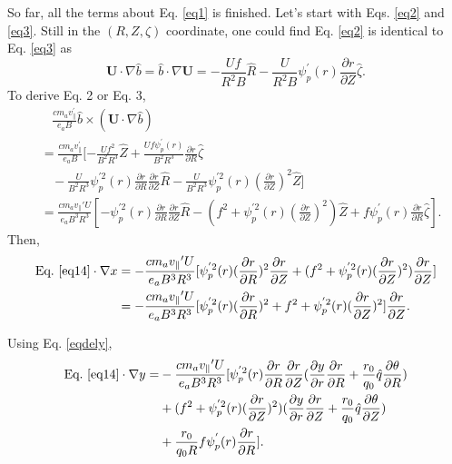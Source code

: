 \documentclass[12pt]{article}
\begin{document}
\begin{CJK*}{UTF8}{gbsn}
So far, all the terms about Eq. \ref{eq1} is finished. Let's start with Eqs. \ref{eq2} and \ref{eq3}.
Still in the $(R,Z,\zeta)$ coordinate, one could find Eq. \ref{eq2} is identical to Eq. \ref{eq3} as
\begin{equation}
    \mathbf{U}\cdot\nabla\hat{b} = \hat{b}\cdot\nabla\mathbf{U} = - \frac{Uf}{R^2B}\hat{R} - \frac{U}{R^2B}\psi_p^{'}(r)\frac{\partial r}{\partial Z}\hat{\zeta}.
\end{equation}
To derive Eq. 2 or Eq. 3, 
\begin{equation}
\begin{split}
    &\ \ \ \  \frac{cm_av_{\parallel}^{'}}{e_aB} \hat{b} \times (\mathbf{U}\cdot\nabla\hat{b}) \\&= \frac{cm_av_{\parallel}^{'}}{e_aB}
    [-\frac{Uf^2}{B^2R^3}\hat{Z} + \frac{Uf\psi^{'}_p(r)}{B^2R^3}\frac{\partial r}{\partial R}\hat{\zeta}\\
     &\ \ \ \ -\frac{U}{B^2R^3}\psi_p^{'2}(r)\frac{\partial r}{\partial R}\frac{\partial r}{\partial Z}\hat{R}
     -\frac{U}{B^2R^3}\psi_p^{'2}(r)(\frac{\partial r}{\partial Z})^2\hat{Z}]\\
    &=\frac{cm_av_{\parallel}{'}U}{e_aB^3R^3}[-\psi_p^{'2}(r)\frac{\partial r}{\partial R}\frac{\partial r}{\partial Z}\hat{R}
     -(f^2 + \psi_p^{'2}(r)(\frac{\partial r}{\partial Z})^2)\hat{Z} + f\psi_p^{'}(r)\frac{\partial r}{\partial R}\hat{\zeta}].\label{eq14}
\end{split}
\end{equation}
Then, 
\begin{equation}
\begin{split}
    \textrm{Eq.}\ \ref{eq14} \cdot\nabla x &= -\frac{cm_av_{\parallel}{'}U}{e_aB^3R^3}[\psi_p^{'2}(r)(\frac{\partial r}{\partial R})^2\frac{\partial r}{\partial Z}
    +(f^2 + \psi_p^{'2}(r)(\frac{\partial r}{\partial Z})^2)\frac{\partial r}{\partial Z}]\\
    &= -\frac{cm_av_{\parallel}{'}U}{e_aB^3R^3}[\psi_p^{'2}(r)(\frac{\partial r}{\partial R})^2
       +f^2 + \psi_p^{'2}(r)(\frac{\partial r}{\partial Z})^2]\frac{\partial r}{\partial Z}.
\end{split}
\end{equation}

Using Eq. \ref{eqdely},
\begin{equation}
\begin{split}
    \textrm{Eq.}\ \ref{eq14} \cdot\nabla y =& -\frac{cm_av_{\parallel}{'}U}{e_aB^3R^3}[\psi_p^{'2}(r)\frac{\partial r}{\partial R}\frac{\partial r}{\partial Z}
    (\frac{\partial y}{\partial r}\frac{\partial r}{\partial R} + \frac{r_0}{q_0}\hat{q}\frac{\partial \theta}{\partial R})\\
    &+ (f^2 + \psi_p^{'2}(r)(\frac{\partial r}{\partial Z})^2)(\frac{\partial y}{\partial r}\frac{\partial r}{\partial Z} + 
    \frac{r_0}{q_0}\hat{q}\frac{\partial \theta}{\partial Z})\\
    &+ \frac{r_0}{q_0R}f\psi_p^{'}(r)\frac{\partial r}{\partial R}].
\end{split}
\end{equation}


\end{CJK*}
\end{document}
